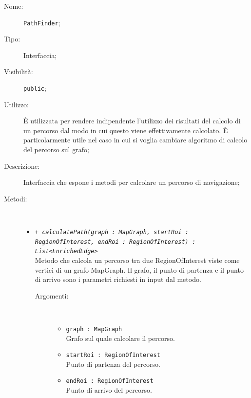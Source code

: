\documentclass[../DefinizioneDiProdotto.tex]{subfiles}
\begin{document}
\begin{description}
	\item[Nome:] \texttt{PathFinder};
	\item[Tipo:] Interfaccia;
	\item[Visibilità:] \texttt{public};
	\item[Utilizzo:] È utilizzata per rendere indipendente l'utilizzo dei risultati del calcolo di un percorso dal modo in cui questo viene effettivamente calcolato. È particolarmente utile nel caso in cui si voglia cambiare algoritmo di calcolo del percorso sul grafo;
	\item[Descrizione:] Interfaccia che espone i metodi per calcolare un percorso di navigazione;
	\item[Metodi:] \
	\begin{itemize}
		\item \texttt{+ \textit{calculatePath(graph : MapGraph, startRoi : RegionOfInterest, endRoi : RegionOfInterest) : List<EnrichedEdge>}}\\
		Metodo che calcola un percorso tra due RegionOfInterest viste come vertici di un grafo MapGraph. Il grafo, il punto di partenza e il punto di arrivo sono i parametri richiesti in input dal metodo.
		\begin{description}
			\item[Argomenti:] \
			\begin{itemize}
				\item \texttt{graph : MapGraph}\\
				Grafo sul quale calcolare il percorso.\item \texttt{startRoi : RegionOfInterest}\\
				Punto di partenza del percorso.\item \texttt{endRoi : RegionOfInterest}\\
				Punto di arrivo del percorso.\end{itemize}
		\end{description}
	\end{itemize}
\end{description}
\end{document}
